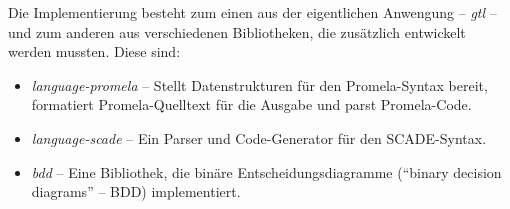 Die Implementierung besteht zum einen aus der eigentlichen Anwengung -- \emph{gtl} -- und zum anderen aus verschiedenen Bibliotheken, die zusätzlich entwickelt werden mussten.
Diese sind:
\begin{itemize}
\item \emph{language-promela} -- Stellt Datenstrukturen für den Promela-Syntax bereit, formatiert Promela-Quelltext für die Ausgabe und parst Promela-Code.
\item \emph{language-scade} -- Ein Parser und Code-Generator für den SCADE-Syntax.
\item \emph{bdd} -- Eine Bibliothek, die binäre Entscheidungsdiagramme ("`binary decision diagrams"' -- BDD) implementiert.
\end{itemize}
